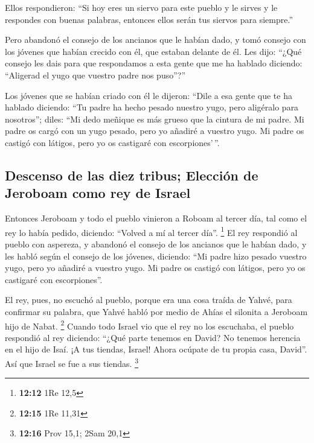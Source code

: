 \begin{paracol}{2}
 Ellos respondieron: ``Si hoy eres un siervo para este
pueblo y le sirves y le respondes con buenas palabras, entonces ellos
serán tus siervos para siempre.''

 Pero abandonó el consejo de los ancianos que le habían
dado, y tomó consejo con los jóvenes que habían crecido con él, que
estaban delante de él.  Les dijo: ``¿Qué consejo les dais
para que respondamos a esta gente que me ha hablado diciendo: ``Aligerad
el yugo que vuestro padre nos puso''?''

 Los jóvenes que se habían criado con él le dijeron:
``Dile a esa gente que te ha hablado diciendo: ``Tu padre ha hecho
pesado nuestro yugo, pero aligéralo para nosotros''; diles: ``Mi dedo
meñique es más grueso que la cintura de mi padre.  Mi
padre os cargó con un yugo pesado, pero yo añadiré a vuestro yugo. Mi
padre os castigó con látigos, pero yo os castigaré con escorpiones'\,''.

\hypertarget{descenso-de-las-diez-tribus-elecciuxf3n-de-jeroboam-como-rey-de-israel}{%
\subsection{Descenso de las diez tribus; Elección de Jeroboam como rey
de
Israel}\label{descenso-de-las-diez-tribus-elecciuxf3n-de-jeroboam-como-rey-de-israel}}

 Entonces Jeroboam y todo el pueblo vinieron a Roboam al
tercer día, tal como el rey lo había pedido, diciendo: ``Volved a mí al
tercer día''. \footnote{\textbf{12:12} 1Re 12,5}  El rey
respondió al pueblo con aspereza, y abandonó el consejo de los ancianos
que le habían dado,  y les habló según el consejo de los
jóvenes, diciendo: ``Mi padre hizo pesado vuestro yugo, pero yo añadiré
a vuestro yugo. Mi padre os castigó con látigos, pero yo os castigaré
con escorpiones''.

 El rey, pues, no escuchó al pueblo, porque era una cosa
traída de Yahvé, para confirmar su palabra, que Yahvé habló por medio de
Ahías el silonita a Jeroboam hijo de Nabat. \footnote{\textbf{12:15} 1Re
  11,31}  Cuando todo Israel vio que el rey no los
escuchaba, el pueblo respondió al rey diciendo: ``¿Qué parte tenemos en
David? No tenemos herencia en el hijo de Isaí. ¡A tus tiendas, Israel!
Ahora ocúpate de tu propia casa, David''. Así que Israel se fue a sus
tiendas. \footnote{\textbf{12:16} Prov 15,1; 2Sam 20,1}


\end{paracol}
